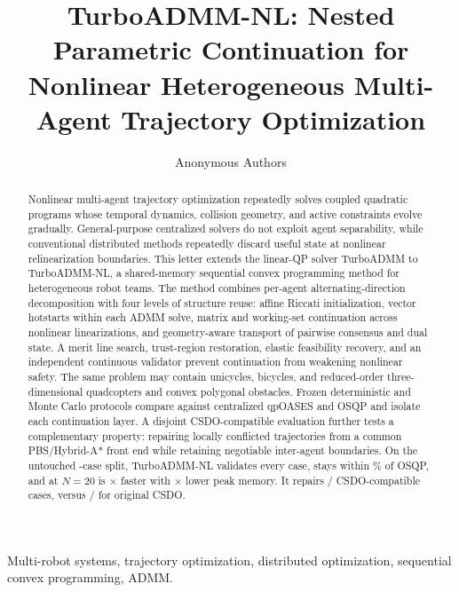\documentclass[letterpaper,10pt,conference]{ieeeconf}
\title{\LARGE \bf TurboADMM-NL: Nested Parametric Continuation for Nonlinear
Heterogeneous Multi-Agent Trajectory Optimization}
\author{Anonymous Authors}
\newcommand{\method}{TurboADMM-NL}
\begin{document}
\maketitle
\thispagestyle{empty}
\pagestyle{empty}

\begin{abstract}
Nonlinear multi-agent trajectory optimization repeatedly solves coupled
quadratic programs whose temporal dynamics, collision geometry, and active
constraints evolve gradually. General-purpose centralized solvers do not
exploit agent separability, while conventional distributed methods repeatedly
discard useful state at nonlinear relinearization boundaries. This letter
extends the linear-QP solver TurboADMM to \method, a shared-memory sequential
convex programming method for heterogeneous robot teams. The method
combines per-agent alternating-direction decomposition with four levels of
structure reuse: affine Riccati initialization, vector hotstarts within each
ADMM solve, matrix and working-set continuation across nonlinear
linearizations, and geometry-aware transport of pairwise consensus and dual
state. A merit line search, trust-region restoration, elastic feasibility
recovery, and an independent continuous validator prevent continuation from
weakening nonlinear safety. The same problem may contain unicycles, bicycles,
and reduced-order three-dimensional quadcopters and convex polygonal
obstacles. Frozen deterministic and Monte Carlo protocols compare against
centralized qpOASES and OSQP and isolate each continuation layer. A disjoint
CSDO-compatible evaluation further tests a complementary property: repairing
locally conflicted trajectories from a common PBS/Hybrid-A* front end while
retaining negotiable inter-agent boundaries.
\ifdefined\PrimaryQpOASESSuccessNFour
On the untouched \PrimaryCases-case split, \method{} validates every case,
stays within \PrimaryMaximumObjectiveGapPercent\% of OSQP, and at $N=20$ is
\WallRatioNTwenty$\times$ faster with \MemoryRatioNTwenty$\times$ lower peak
memory. It repairs \TurboCSDOSuccesses/\CSDOCases{} CSDO-compatible cases,
versus \CSDOSuccesses/\CSDOCases{} for original CSDO.
\fi
\end{abstract}

\begin{keywords}
Multi-robot systems, trajectory optimization, distributed optimization,
sequential convex programming, ADMM.
\end{keywords}
\end{document}
